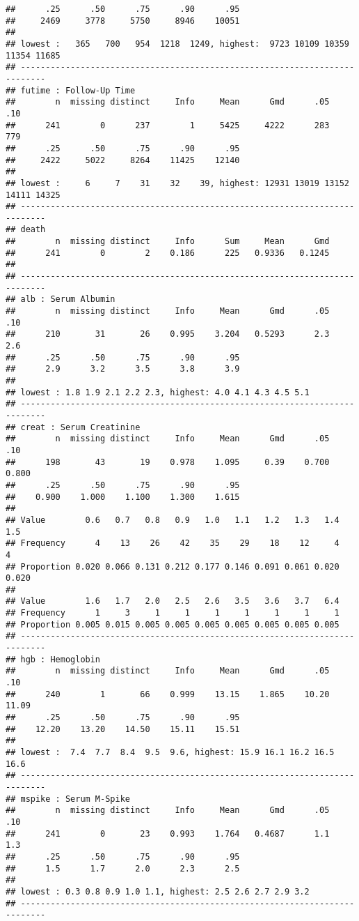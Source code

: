 \documentclass[]{book}
\theoremstyle{definition}
\theoremstyle{definition}
\theoremstyle{definition}
\theoremstyle{remark}
\begin{document}
\begin{verbatim}
##      .25      .50      .75      .90      .95 
##     2469     3778     5750     8946    10051 
## 
## lowest :   365   700   954  1218  1249, highest:  9723 10109 10359 11354 11685
## ---------------------------------------------------------------------------
## futime : Follow-Up Time 
##        n  missing distinct     Info     Mean      Gmd      .05      .10 
##      241        0      237        1     5425     4222      283      779 
##      .25      .50      .75      .90      .95 
##     2422     5022     8264    11425    12140 
## 
## lowest :     6     7    31    32    39, highest: 12931 13019 13152 14111 14325
## ---------------------------------------------------------------------------
## death 
##        n  missing distinct     Info      Sum     Mean      Gmd 
##      241        0        2    0.186      225   0.9336   0.1245 
## 
## ---------------------------------------------------------------------------
## alb : Serum Albumin 
##        n  missing distinct     Info     Mean      Gmd      .05      .10 
##      210       31       26    0.995    3.204   0.5293      2.3      2.6 
##      .25      .50      .75      .90      .95 
##      2.9      3.2      3.5      3.8      3.9 
## 
## lowest : 1.8 1.9 2.1 2.2 2.3, highest: 4.0 4.1 4.3 4.5 5.1
## ---------------------------------------------------------------------------
## creat : Serum Creatinine 
##        n  missing distinct     Info     Mean      Gmd      .05      .10 
##      198       43       19    0.978    1.095     0.39    0.700    0.800 
##      .25      .50      .75      .90      .95 
##    0.900    1.000    1.100    1.300    1.615 
##                                                                       
## Value        0.6   0.7   0.8   0.9   1.0   1.1   1.2   1.3   1.4   1.5
## Frequency      4    13    26    42    35    29    18    12     4     4
## Proportion 0.020 0.066 0.131 0.212 0.177 0.146 0.091 0.061 0.020 0.020
##                                                                 
## Value        1.6   1.7   2.0   2.5   2.6   3.5   3.6   3.7   6.4
## Frequency      1     3     1     1     1     1     1     1     1
## Proportion 0.005 0.015 0.005 0.005 0.005 0.005 0.005 0.005 0.005
## ---------------------------------------------------------------------------
## hgb : Hemoglobin 
##        n  missing distinct     Info     Mean      Gmd      .05      .10 
##      240        1       66    0.999    13.15    1.865    10.20    11.09 
##      .25      .50      .75      .90      .95 
##    12.20    13.20    14.50    15.11    15.51 
## 
## lowest :  7.4  7.7  8.4  9.5  9.6, highest: 15.9 16.1 16.2 16.5 16.6
## ---------------------------------------------------------------------------
## mspike : Serum M-Spike 
##        n  missing distinct     Info     Mean      Gmd      .05      .10 
##      241        0       23    0.993    1.764   0.4687      1.1      1.3 
##      .25      .50      .75      .90      .95 
##      1.5      1.7      2.0      2.3      2.5 
## 
## lowest : 0.3 0.8 0.9 1.0 1.1, highest: 2.5 2.6 2.7 2.9 3.2
## ---------------------------------------------------------------------------
\end{verbatim}
\end{document}

